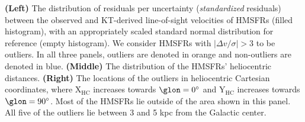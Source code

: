 \label{fig:outliers}
\textbf{(Left)} The distribution of residuals per uncertainty (\textit{standardized} residuals) between the observed and KT-derived line-of-sight velocities of HMSFRs (filled histogram), with an appropriately scaled standard normal distribution for reference (empty histogram). We consider HMSFRs with $\vert \Delta v / \sigma \vert > 3$ to be outliers. In all three panels, outliers are denoted in orange and non-outliers are denoted in blue. \textbf{(Middle)} The distribution of the HMSFRs' heliocentric distances. \textbf{(Right)} The locations of the outliers in heliocentric Cartesian coordinates, where $\mathrm{X_{HC}}$ increases towards $\glon=0^\circ$ and $\mathrm{Y_{HC}}$ increases towards $\glon=90^\circ$. Most of the HMSFRs lie outside of the area shown in this panel. All five of the outliers lie between 3 and 5 kpc from the Galactic center.